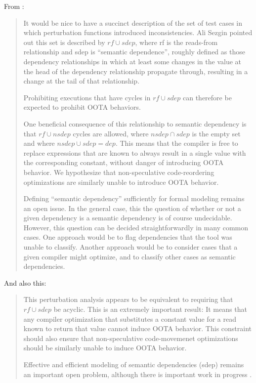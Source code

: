 From \cite{vacuous}:

\begin{quotation}
  It would be nice to have a succinct description of the set of test cases in
  which perturbation functions introduced inconsistencies. Ali Sezgin pointed
  out this set is described by $rf \cup sdep$, where rf is the reads-from
  relationship and sdep is ``semantic dependence'', roughly defined as those
  dependency relationships in which at least some changes in the value at the
  head of the dependency relationship propagate through, resulting in a
  change at the tail of that relationship.

  Prohibiting executions that have cycles in $rf \cup sdep$ can therefore be
  expected to prohibit OOTA behaviors.

  One beneficial consequence of this relationship to semantic dependency is
  that $rf \cup nsdep$ cycles are allowed, where $nsdep \cap sdep$ is the empty set and
  where $nsdep \cup sdep = dep$. This means that the compiler is free to replace
  expressions that are known to always result in a single value with the
  corresponding constant, without danger of introducing OOTA behavior. We
  hypothesize that non-speculative code-reordering optimizations are
  similarly unable to introduce OOTA behavior.

  Defining ``semantic dependency'' sufficiently for formal modeling remains an
  open issue. In the general case, this the question of whether or not a
  given dependency is a semantic dependency is of course
  undecidable. However, this question can be decided straightforwardly in
  many common cases. One approach would be to flag dependencies that the tool
  was unable to classify. Another approach would be to consider cases that a
  given compiler might optimize, and to classify other cases as semantic
  dependencies.
\end{quotation}

And also this:

\begin{quotation}
  This perturbation analysis appears to be equivalent to requiring that $rf \cup
  sdep$ be acyclic. This is an extremely important result: It means that any
  compiler optimization that substitutes a constant value for a read known to
  return that value cannot induce OOTA behavior. This constraint should also
  ensure that non-speculative code-movemenet optimizations should be
  similarly unable to induce OOTA behavior.

  Effective and efficient modeling of semantic dependencies (sdep) remains an
  important open problem, although there is important work in progress
  \cite{Pichon-Pharabod:2016:CSR:2837614.2837616}.
\end{quotation}

